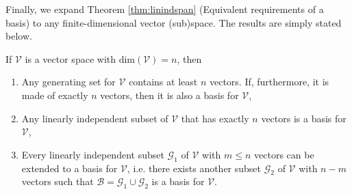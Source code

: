 Finally, we expand Theorem \ref{thm:linindspan} (Equivalent requirements of a basis) to any finite-dimensional vector (sub)space. The results are simply stated below.
\begin{proper}
\label{proper:linindspanbasisnewver}
If $\mathcal{V}$ is a vector space with $\text{dim}(\mathcal{V}) = n$, then
\begin{enumerate}[label=(\alph*)]
    \item Any generating set for $\mathcal{V}$ contains at least $n$ vectors. If, furthermore, it is made of exactly $n$ vectors, then it is also a basis for $\mathcal{V}$,
    \item Any linearly independent subset of $\mathcal{V}$ that has exactly $n$ vectors is a basis for $\mathcal{V}$,
    \item Every linearly independent subset $\mathcal{G}_1$ of $\mathcal{V}$ with $m \leq n$ vectors can be extended to a basis for $\mathcal{V}$, i.e. there exists another subset $\mathcal{G}_2$ of $\mathcal{V}$ with $n-m$ vectors such that $\mathcal{B} = \mathcal{G}_1 \cup \mathcal{G}_2$ is a basis for $\mathcal{V}$.
\end{enumerate}
\end{proper}
